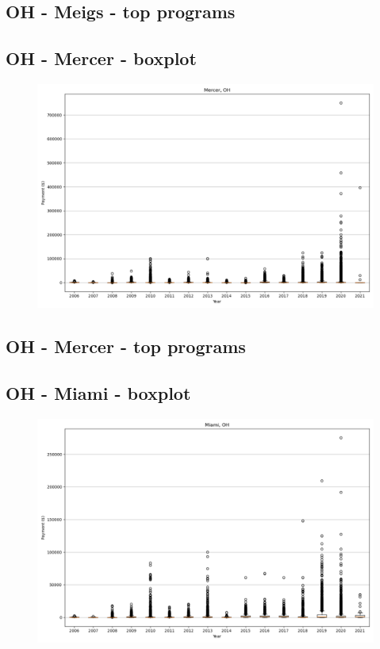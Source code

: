 \subsection*{OH - Meigs - top programs}

\newpage
\subsection*{OH - Mercer - boxplot}
\begin{figure}[h]
\centering
\includegraphics[width=7in]{../output/boxplots/counties/Mercer-OH_boxplot.png}
\end{figure}


\subsection*{OH - Mercer - top programs}

\newpage
\subsection*{OH - Miami - boxplot}
\begin{figure}[h]
\centering
\includegraphics[width=7in]{../output/boxplots/counties/Miami-OH_boxplot.png}
\end{figure}


